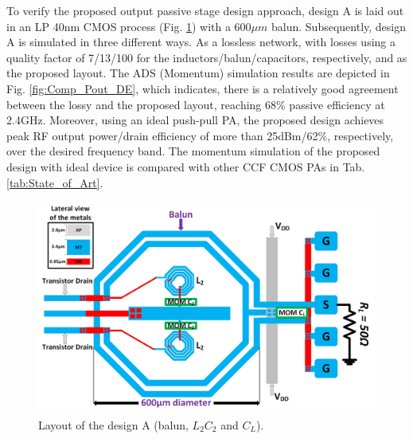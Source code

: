 \documentclass[conference]{IEEEtran}
\begin{document}
To verify the proposed output passive stage design approach,  design A is laid out in an LP 40nm CMOS process (Fig. \ref{fig:ON_X1}) with a 600$\mu m$ balun. Subsequently, design A is simulated in three different ways. As a lossless network, with losses using a quality factor of 7/13/100 for the inductors/balun/capacitors, respectively, and as the proposed layout. The ADS (Momentum) simulation results are depicted in Fig. \ref{fig:Comp_Pout_DE}, which indicates, there is a relatively good agreement between the lossy and the proposed layout, reaching 68\% passive efficiency at 2.4GHz. Moreover, using an ideal push-pull PA, the proposed design achieves peak RF output power/drain efficiency of more than 25dBm/62\%, respectively, over the desired frequency band. The momentum simulation of the proposed design with ideal device is compared with other CCF CMOS PAs in Tab. \ref{tab:State_of_Art}. 

\begin{figure}[!t]
\centering
\captionsetup{font=footnotesize}
\includegraphics[width=1\linewidth]{Images/Output_Network_Comp/Balun_V2.jpg}
\caption{Layout of the design A (balun, $L_2C_2$ and $C_L$).}
\label{fig:ON_X1}
\vspace{-0.1in}
\end{figure}
\end{document}
